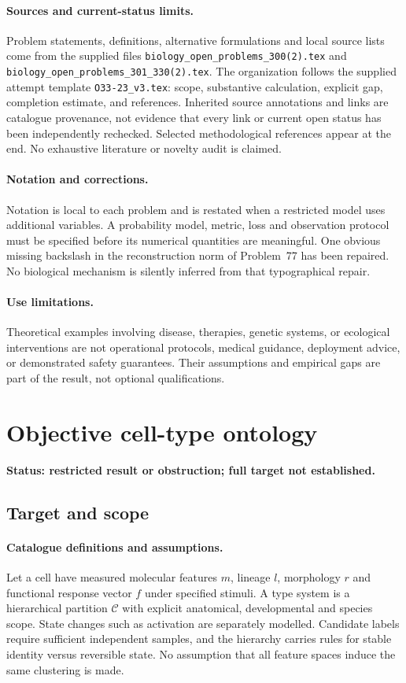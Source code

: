\documentclass[11pt]{article}
\begin{document}
\paragraph{Sources and current-status limits.}
Problem statements, definitions, alternative formulations and local source lists
come from the supplied files
\texttt{biology\_open\_problems\_300(2).tex} and
\texttt{biology\_open\_problems\_301\_330(2).tex}.
The organization follows the supplied attempt template
\texttt{O33-23\_v3.tex}: scope, substantive calculation, explicit gap,
completion estimate, and references. Inherited source annotations and links are
catalogue provenance, not evidence that every link or current open status has
been independently rechecked. Selected methodological references appear at the
end. No exhaustive literature or novelty audit is claimed.

\paragraph{Notation and corrections.}
Notation is local to each problem and is restated when a restricted model uses
additional variables. A probability model, metric, loss and observation protocol
must be specified before its numerical quantities are meaningful. One obvious
missing backslash in the reconstruction norm of Problem~77 has been repaired.
No biological mechanism is silently inferred from that typographical repair.

\paragraph{Use limitations.}
Theoretical examples involving disease, therapies, genetic systems, or ecological
interventions are not operational protocols, medical guidance, deployment advice,
or demonstrated safety guarantees. Their assumptions and empirical gaps are part
of the result, not optional qualifications.


\section*{Objective cell-type ontology}
\label{prob:079}
\noindent\textbf{Status: restricted result or obstruction; full target not established.}
\subsection{Target and scope}
\paragraph{Catalogue definitions and assumptions.}
Let a cell have measured molecular features $m$, lineage $l$, morphology $r$ and functional response vector $f$ under specified stimuli. A type system is a hierarchical partition $\mathcal C$ with explicit anatomical, developmental and species scope. State changes such as activation are separately modelled. Candidate labels require sufficient independent samples, and the hierarchy carries rules for stable identity versus reversible state. No assumption that all feature spaces induce the same clustering is made.
\end{document}
